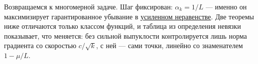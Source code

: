 Возвращаемся к многомерной задаче. Шаг фиксирован: $\alpha_k = 1/L$ --- именно он максимизирует гарантированное убывание в \hyperref[note:379E4CAD-A44B-4631-8DAF-F3DC708EAEDE]{усиленном неравенстве}. Две теоремы ниже отличаются только классом функций, и таблица из определения невязки показывает, что меняется: без сильной выпуклости контролируется лишь норма градиента со скоростью $c/\sqrt{k}$, с ней --- сами точки, линейно со знаменателем $1 - \mu/L$.
